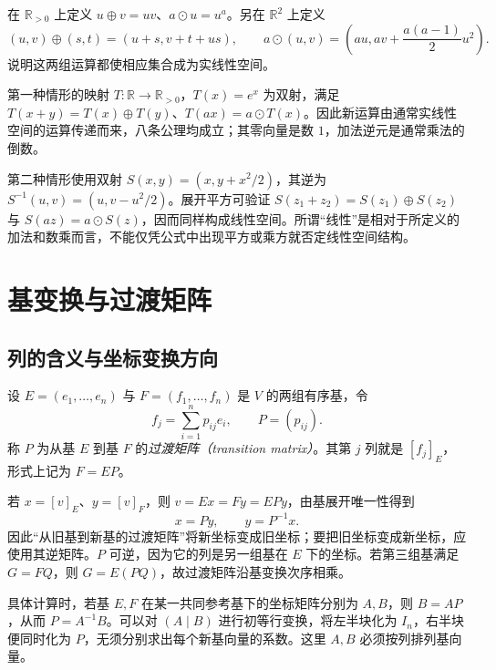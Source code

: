 \begin{example}
\label{ex:laex-unusual-operations}
在 $\mathbb R_{>0}$ 上定义 $u\oplus v=uv$、$a\odot u=u^a$。另在 $\mathbb R^2$ 上定义
\[
(u,v)\oplus(s,t)=(u+s,v+t+us),\qquad
a\odot(u,v)=\left(au,av+\frac{a(a-1)}2u^2\right).
\]
说明这两组运算都使相应集合成为实线性空间。
\end{example}

\begin{solve}
第一种情形的映射 $T:\mathbb R\to\mathbb R_{>0}$，$T(x)=e^x$ 为双射，满足 $T(x+y)=T(x)\oplus T(y)$、$T(ax)=a\odot T(x)$。因此新运算由通常实线性空间的运算传递而来，八条公理均成立；其零向量是数 $1$，加法逆元是通常乘法的倒数。

第二种情形使用双射 $S(x,y)=(x,y+x^2/2)$，其逆为 $S^{-1}(u,v)=(u,v-u^2/2)$。展开平方可验证 $S(z_1+z_2)=S(z_1)\oplus S(z_2)$ 与 $S(az)=a\odot S(z)$，因而同样构成线性空间。所谓“线性”是相对于所定义的加法和数乘而言，不能仅凭公式中出现平方或乘方就否定线性空间结构。
\end{solve}

\section{基变换与过渡矩阵}
\label{sec:laex-change-basis}

\subsection{列的含义与坐标变换方向}

\begin{definition}
\label{def:laex-transition}
设 $E=(e_1,\ldots,e_n)$ 与 $F=(f_1,\ldots,f_n)$ 是 $V$ 的两组有序基，令
\[
f_j=\sum_{i=1}^n p_{ij}e_i,\qquad P=(p_{ij}).
\]
称 $P$ 为从基 $E$ 到基 $F$ 的\emph{过渡矩阵（transition matrix）}。其第 $j$ 列就是 $[f_j]_E$，形式上记为 $F=EP$。
\end{definition}

若 $x=[v]_E$、$y=[v]_F$，则 $v=Ex=Fy=EPy$，由基展开唯一性得到
\begin{equation}
\label{eq:laex-coordinate-change}
x=Py,\qquad y=P^{-1}x.
\end{equation}
因此“从旧基到新基的过渡矩阵”将新坐标变成旧坐标；要把旧坐标变成新坐标，应使用其逆矩阵。$P$ 可逆，因为它的列是另一组基在 $E$ 下的坐标。若第三组基满足 $G=FQ$，则 $G=E(PQ)$，故过渡矩阵沿基变换次序相乘。

具体计算时，若基 $E,F$ 在某一共同参考基下的坐标矩阵分别为 $A,B$，则 $B=AP$，从而 $P=A^{-1}B$。可以对 $(A\mid B)$ 进行初等行变换，将左半块化为 $I_n$，右半块便同时化为 $P$，无须分别求出每个新基向量的系数。这里 $A,B$ 必须按列排列基向量。

